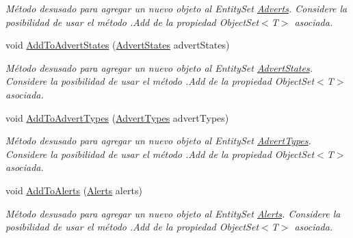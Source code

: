 \begin{DoxyCompactItemize}
\begin{DoxyCompactList}\small\item\em Método desusado para agregar un nuevo objeto al Entity\-Set \hyperlink{class_microsoft_1_1_samples_1_1_kinect_1_1_basic_interactions_1_1_adverts}{Adverts}. Considere la posibilidad de usar el método .Add de la propiedad Object\-Set$<$T$>$ asociada. \end{DoxyCompactList}\item 
void \hyperlink{class_microsoft_1_1_samples_1_1_kinect_1_1_basic_interactions_1_1_o_m_k_t_d_b_entities_a458e7fb48de34caff008a0900a8dfec8}{Add\-To\-Advert\-States} (\hyperlink{class_microsoft_1_1_samples_1_1_kinect_1_1_basic_interactions_1_1_advert_states}{Advert\-States} advert\-States)
\begin{DoxyCompactList}\small\item\em Método desusado para agregar un nuevo objeto al Entity\-Set \hyperlink{class_microsoft_1_1_samples_1_1_kinect_1_1_basic_interactions_1_1_advert_states}{Advert\-States}. Considere la posibilidad de usar el método .Add de la propiedad Object\-Set$<$T$>$ asociada. \end{DoxyCompactList}\item 
void \hyperlink{class_microsoft_1_1_samples_1_1_kinect_1_1_basic_interactions_1_1_o_m_k_t_d_b_entities_affb3d1c95a057cab1403eefb46839d54}{Add\-To\-Advert\-Types} (\hyperlink{class_microsoft_1_1_samples_1_1_kinect_1_1_basic_interactions_1_1_advert_types}{Advert\-Types} advert\-Types)
\begin{DoxyCompactList}\small\item\em Método desusado para agregar un nuevo objeto al Entity\-Set \hyperlink{class_microsoft_1_1_samples_1_1_kinect_1_1_basic_interactions_1_1_advert_types}{Advert\-Types}. Considere la posibilidad de usar el método .Add de la propiedad Object\-Set$<$T$>$ asociada. \end{DoxyCompactList}\item 
void \hyperlink{class_microsoft_1_1_samples_1_1_kinect_1_1_basic_interactions_1_1_o_m_k_t_d_b_entities_a39af2fdbcb6759fbc216b1a00285c9d0}{Add\-To\-Alerts} (\hyperlink{class_microsoft_1_1_samples_1_1_kinect_1_1_basic_interactions_1_1_alerts}{Alerts} alerts)
\begin{DoxyCompactList}\small\item\em Método desusado para agregar un nuevo objeto al Entity\-Set \hyperlink{class_microsoft_1_1_samples_1_1_kinect_1_1_basic_interactions_1_1_alerts}{Alerts}. Considere la posibilidad de usar el método .Add de la propiedad Object\-Set$<$T$>$ asociada. \end{DoxyCompactList}\item 

\end{DoxyCompactItemize}
